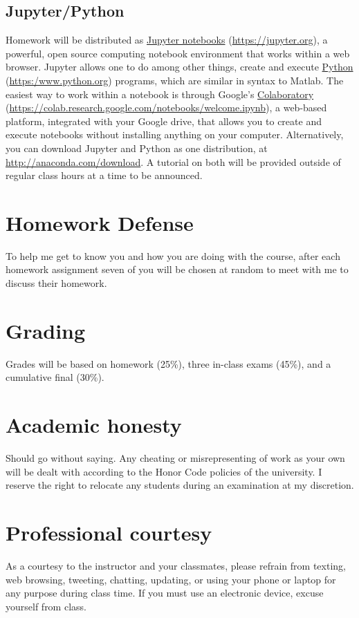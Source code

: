 \documentclass[11pt]{article}
\begin{document}
\subsection{Jupyter/Python}
\label{sec:orgd060afe}
Homework will be distributed as \href{https://jupyter.org/}{Jupyter notebooks} (\url{https://jupyter.org}), a powerful, open source computing notebook environment that works within a web browser. Jupyter allows one to do among other things, create and execute \href{https://www.python.org/}{Python} (\url{https:/www.python.org}) programs, which are similar in syntax to Matlab. The easiest way to work within a notebook is through Google's \href{https://colab.research.google.com/notebooks/welcome.ipynb}{Colaboratory} (\url{https://colab.research.google.com/notebooks/welcome.ipynb}), a web-based platform, integrated with your Google drive, that allows you to create and execute notebooks without installing anything on your computer. Alternatively, you can download Jupyter and Python as one distribution, at \url{http://anaconda.com/download}. A tutorial on both will be provided outside of regular class hours at a time to be announced.
\section{Homework Defense}
\label{sec:org448a53d}
To help me get to know you and how you are doing with the course, after each homework assignment seven of you will be chosen at random to meet with me to discuss their homework.

\section{Grading}
\label{sec:org4b369f8}
Grades will be based on homework (25\%), three in-class exams (45\%), and a cumulative final (30\%).

\section{Academic honesty}
\label{sec:orgb0b76a1}
Should go without saying. Any cheating or misrepresenting of work as your own will be dealt with according to the Honor Code policies of the university. I reserve the right to relocate any students during an examination at my discretion.

\section{Professional courtesy}
\label{sec:org7129bc8}
As a courtesy to the instructor and your classmates, please refrain from
texting, web browsing, tweeting, chatting, updating, or using your phone or laptop for any
purpose during class time.  If you must use an electronic device, excuse
yourself from class.
\end{document}
